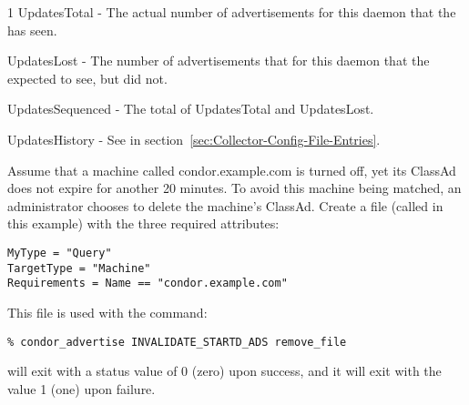 \begin{ManPage}{\label{man-condor-advertise}}{1}
UpdatesTotal - The actual number of advertisements for this
daemon that the  has seen.

UpdatesLost - The number of advertisements that for this daemon
that the  expected to see, but did not.

UpdatesSequenced - The total of UpdatesTotal and UpdatesLost.

UpdatesHistory - See  in
section~\ref{sec:Collector-Config-File-Entries}.

\Examples

Assume that a machine called condor.example.com is turned off,
yet its  ClassAd does not expire for another 20 minutes.
To avoid this machine being matched, an administrator chooses
to delete the machine's  ClassAd.
Create a file (called  in this example)
with the three required attributes:
\begin{verbatim}
MyType = "Query"
TargetType = "Machine"
Requirements = Name == "condor.example.com"
\end{verbatim}

This file is used with the command:
\begin{verbatim}
% condor_advertise INVALIDATE_STARTD_ADS remove_file 
\end{verbatim}

\ExitStatus

 will exit with a status value of 0 (zero) upon success,
and it will exit with the value 1 (one) upon failure.

\end{ManPage}
